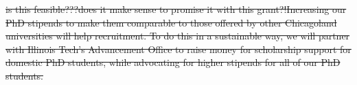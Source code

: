 \documentclass[11pt]{NSFamsart}
\begin{document}
{\sout{{\color{red}is this feasible???does it make sense to promise it with this grant?!}Increasing our PhD stipends to make them comparable to those offered by other Chicagoland universities will help recruitment. To do this in a sustainable way, we will partner with Illinois Tech's Advancement Office to raise money for scholarship support for domestic PhD students, while advocating for higher stipends for all of our PhD students.}






}
\end{document}
